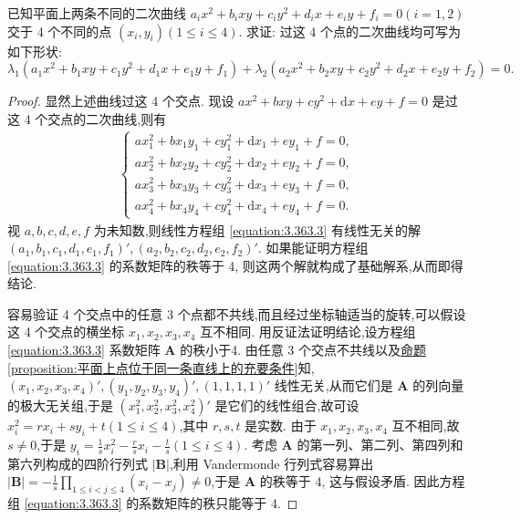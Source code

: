\documentclass[../../main.tex]{subfiles}%
\begin{document}
\begin{example}
已知平面上两条不同的二次曲线 \(a_ix^2 + b_ixy + c_iy^2 + d_ix + e_iy + f_i = 0(i = 1,2)\) 交于 4 个不同的点 \((x_i,y_i)(1\leqslant  i\leqslant  4)\). 求证: 过这 4 个点的二次曲线均可写为如下形状:
\[
\lambda_1(a_1x^2 + b_1xy + c_1y^2 + d_1x + e_1y + f_1)+\lambda_2(a_2x^2 + b_2xy + c_2y^2 + d_2x + e_2y + f_2)=0.
\]
\end{example}
\begin{proof}

显然上述曲线过这 4 个交点. 现设 \(ax^2 + bxy + cy^2 + \mathrm{d}x + ey + f = 0\) 是过这 4 个交点的二次曲线,则有
\begin{align}\label{equation:3.363.3}
\begin{cases}
ax_1^2 + bx_1y_1 + cy_1^2 + \mathrm{d}x_1 + ey_1 + f = 0,\\
ax_2^2 + bx_2y_2 + cy_2^2 + \mathrm{d}x_2 + ey_2 + f = 0,\\
ax_3^2 + bx_3y_3 + cy_3^2 + \mathrm{d}x_3 + ey_3 + f = 0,\\
ax_4^2 + bx_4y_4 + cy_4^2 + \mathrm{d}x_4 + ey_4 + f = 0.
\end{cases}
\end{align}
视 \(a,b,c,d,e,f\) 为未知数,则线性方程组 \eqref{equation:3.363.3} 有线性无关的解 \((a_1,b_1,c_1,d_1,e_1,f_1)',(a_2,b_2,c_2,d_2,e_2,f_2)'\). 如果能证明方程组 \eqref{equation:3.363.3} 的系数矩阵的秩等于 4, 则这两个解就构成了基础解系,从而即得结论.

容易验证 4 个交点中的任意 3 个点都不共线,而且经过坐标轴适当的旋转,可以假设这 4 个交点的横坐标 \(x_1,x_2,x_3,x_4\) 互不相同. 用反证法证明结论,设方程组 \eqref{equation:3.363.3} 系数矩阵 \(\boldsymbol{A}\) 的秩小于4. 由任意 3 个交点不共线以及\hyperref[proposition:平面上点位于同一条直线上的充要条件]{命题\ref{proposition:平面上点位于同一条直线上的充要条件}}知,\((x_1,x_2,x_3,x_4)',(y_1,y_2,y_3,y_4)',(1,1,1,1)'\) 线性无关,从而它们是 \(\boldsymbol{A}\) 的列向量的极大无关组,于是 \((x_1^2,x_2^2,x_3^2,x_4^2)'\) 是它们的线性组合,故可设 \(x_i^2 = rx_i + sy_i + t(1\leqslant  i\leqslant  4)\),其中 \(r,s,t\) 是实数. 由于 \(x_1,x_2,x_3,x_4\) 互不相同,故 \(s\neq 0\),于是 \(y_i = \frac{1}{s}x_i^2 - \frac{r}{s}x_i - \frac{t}{s}(1\leqslant  i\leqslant  4)\). 考虑 \(\boldsymbol{A}\) 的第一列、第二列、第四列和第六列构成的四阶行列式 \(|\boldsymbol{B}|\),利用 Vandermonde 行列式容易算出 \(|\boldsymbol{B}|=-\frac{1}{s}\prod_{1\leqslant  i < j\leqslant  4}(x_i - x_j)\neq 0\),于是 \(\boldsymbol{A}\) 的秩等于 4, 这与假设矛盾. 因此方程组 \eqref{equation:3.363.3} 的系数矩阵的秩只能等于 4.

\end{proof}
\end{document}
